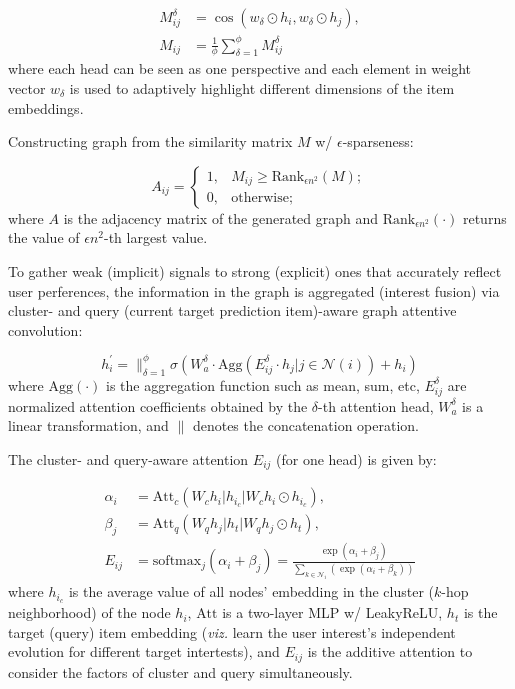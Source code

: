 \begin{align}
	M_{ij}^\delta &= \cos(w_\delta \odot h_i, w_\delta \odot h_j), \\
	M_{ij} &= \frac{1}{\phi} \sum_{\delta = 1}^\phi M_{ij}^\delta
\end{align}
where each head can be seen as one perspective and each element in weight vector $w_\delta$ is used to adaptively highlight different dimensions of the item embeddings.

Constructing graph from the similarity matrix $M$ w/ $\epsilon$-sparseness:

\begin{equation}
	A_{ij} = \begin{cases}
		1, & M_{ij} \ge \text{Rank}_{\epsilon n^2} (M); \\
		0, & \text{otherwise};
	\end{cases}
\end{equation}
where $A$ is the adjacency matrix of the generated graph and $\text{Rank}_{\epsilon n^2}(\cdot)$ returns the value of $\epsilon n^2$-th largest value.

To gather weak (implicit) signals to strong (explicit) ones that accurately reflect user perferences, the information in the graph is aggregated (interest fusion) via cluster- and query (current target prediction item)-aware graph attentive convolution:

\begin{equation}
	h_i^\prime = \parallel_{\delta = 1}^\phi \sigma (W_a^\delta \cdot \text{Agg}(E_{ij}^\delta \cdot h_j | j \in \mathcal{N}(i)) + h_i)
\end{equation}
where $\text{Agg}(\cdot)$ is the aggregation function such as mean, sum, etc, $E_{ij}^\delta$ are normalized attention coefficients obtained by the $\delta$-th attention head, $W_a^\delta$ is a linear transformation, and $\parallel$ denotes the concatenation operation.

The cluster- and query-aware attention $E_{ij}$ (for one head) is given by:

\begin{align}
	\alpha_i &= \text{Att}_c (W_c h_i \vert h_{i_c} \vert W_c h_i \odot h_{i_c}), \\
	\beta_j &= \text{Att}_q (W_q h_j \vert h_t \vert W_q h_j \odot h_t), \\
	E_{ij} &= \text{softmax}_j (\alpha_i + \beta_j) = \frac{\exp (\alpha_i + \beta_j)}{\sum_{k \in \mathcal{N}_i} (\exp (\alpha_i + \beta_k))}
\end{align}
where $h_{i_c}$ is the average value of all nodes' embedding in the cluster ($k$-hop neighborhood) of the node $h_i$, $\text{Att}$ is a two-layer MLP w/ LeakyReLU, $h_t$ is the target (query) item embedding (\textit{viz.} learn the user interest's independent evolution for different target intertests), and $E_{ij}$ is the additive attention to consider the factors of cluster and query simultaneously.

